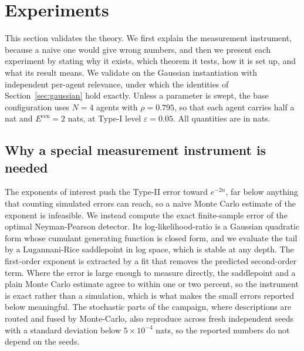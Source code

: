 \documentclass[journal]{IEEEtran}
\theoremstyle{definition}
\theoremstyle{remark}
\newcommand{\Ecen}{E^{\mathrm{cen}}}
\begin{document}
\section{Experiments}\label{sec:exp}
This section validates the theory. We first explain the measurement instrument, because a naive one would give
wrong numbers, and then we present each experiment by stating why it exists, which theorem it tests, how it is
set up, and what its result means. We validate on the Gaussian instantiation with independent per-agent relevance,
under which the identities of Section~\ref{sec:gaussian} hold exactly. Unless a parameter is swept, the base
configuration uses $N=4$ agents with $\rho=0.795$, so that each agent carries half a nat and $\Ecen=2$ nats, at
Type-I level $\varepsilon=0.05$. All quantities are in nats.

\subsection{Why a special measurement instrument is needed}
The exponents of interest push the Type-II error toward $e^{-2n}$, far below anything that counting
simulated errors can reach, so a naive Monte Carlo estimate of the exponent is infeasible. We instead compute the
exact finite-sample error of the optimal Neyman-Pearson detector. Its log-likelihood-ratio is a Gaussian
quadratic form whose cumulant generating function is closed form, and we evaluate the tail by a Lugannani-Rice
saddlepoint in log space, which is stable at any depth. The first-order exponent is extracted by a fit that
removes the predicted second-order term. Where the error is large enough to measure directly, the saddlepoint and
a plain Monte Carlo estimate agree to within one or two percent, so the instrument is exact rather than a
simulation, which is what makes the small errors reported below meaningful. The stochastic parts of the campaign,
where descriptions are routed and fused by Monte-Carlo, also reproduce across fresh independent seeds with a
standard deviation below $5\times10^{-4}$ nats, so the reported numbers do not depend on the seeds.
\end{document}
